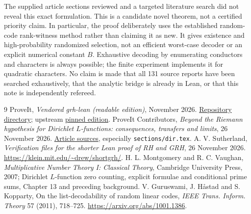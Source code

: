 \documentclass[11pt]{article}
\theoremstyle{remark}\newtheorem{remark}[theorem]{Remark}
\begin{document}
The supplied article sections reviewed and a targeted literature search did not reveal this exact formulation. This is a candidate novel theorem, not a certified priority claim. In particular, the proof deliberately uses the established random-code rank-witness method rather than claiming it as new. It gives existence and high-probability randomized selection, not an efficient worst-case decoder or an explicit numerical constant $B$. Exhaustive decoding by enumerating conductors and characters is always possible; the finite experiment implements it for quadratic characters. No claim is made that all 131 source reports have been searched exhaustively, that the analytic bridge is already in Lean, or that this note is independently refereed.

{\small\begin{thebibliography}{9}\setlength{\itemsep}{2pt}
 ProveIt, \emph{Vendored grh-lean (readable edition)}, November 2026. \href{https://github.com/VladimirReshetnikov/ProveIt/tree/main/Analysis/GeneralizedRiemannHypothesis/vendor/grh-lean}{Repository directory}; upstream \href{https://github.com/lsernau/grh-lean/tree/72fead102f663d5c7a407964a13dc0cf9d977207/grh}{pinned edition}.
 ProveIt Contributors, \emph{Beyond the Riemann hypothesis for Dirichlet $L$-functions: consequences, transfers and limits}, 26 November 2026. \href{https://github.com/VladimirReshetnikov/ProveIt/tree/main/Analysis/GeneralizedRiemannHypothesis/Article}{Article sources}, especially \texttt{sections/dir.tex}.
 A. V. Sutherland, \emph{Verification files for the shorter Lean proof of RH and GRH}, 26 November 2026. \url{https://klein.mit.edu/~drew/shortgrh/}.
 H. L. Montgomery and R. C. Vaughan, \emph{Multiplicative Number Theory I: Classical Theory}, Cambridge University Press, 2007; Dirichlet $L$-function zero counting, explicit formulae and conditional prime sums, Chapter 13 and preceding background.
 V. Guruswami, J. H\aa stad and S. Kopparty, On the list-decodability of random linear codes, \emph{IEEE Trans. Inform. Theory} 57 (2011), 718--725. \url{https://arxiv.org/abs/1001.1386}.
\end{thebibliography}}
\end{document}
